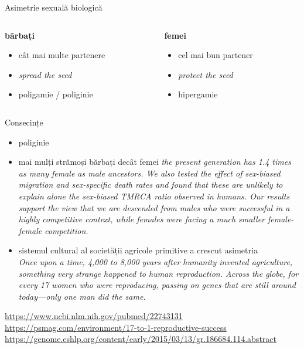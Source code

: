 \documentclass{simple}
\begin{document}
\begin{frame}{Asimetrie sexuală biologică}
  \begin{columns}
    \begin{column}{0.5\textwidth}
      \textbf{bărbați}
        \begin{itemize}
          \scriptsize
          \pause
          \item cât mai multe partenere
          \pause
          \item \textit{spread the seed}
          \pause
          \item poligamie / poliginie
        \end{itemize}
    \end{column}
    \begin{column}{0.5\textwidth}
      \textbf{femei}
        \begin{itemize}
          \scriptsize
          \pause
          \item cel mai bun partener
          \pause
          \item \textit{protect the seed}
          \pause
          \item hipergamie
        \end{itemize}
    \end{column}
  \end{columns}
\end{frame}

\begin{frame}{Consecințe}
  \begin{itemize}
    \pause
    \item poliginie
    \pause
    \item mai mulți strămoși bărbați decât femei
      \textit{the present generation has 1.4 times as many female as male ancestors. We also tested the effect of sex-biased migration and sex-specific death rates and found that these are unlikely to explain alone the sex-biased TMRCA ratio observed in humans. Our results support the view that we are descended from males who were successful in a highly competitive context, while females were facing a much smaller female-female competition.}
    \pause
    \item sistemul cultural al societății agricole primitive a crescut asimetria \\
      \textit{Once upon a time, 4,000 to 8,000 years after humanity invented agriculture, something very strange happened to human reproduction. Across the globe, for every 17 women who were reproducing, passing on genes that are still around today—only one man did the same.}
  \end{itemize}
  \pause
  \url{https://www.ncbi.nlm.nih.gov/pubmed/22743131}
  \url{https://psmag.com/environment/17-to-1-reproductive-success} \\
  \url{https://genome.cshlp.org/content/early/2015/03/13/gr.186684.114.abstract}
\end{frame}
\end{document}
